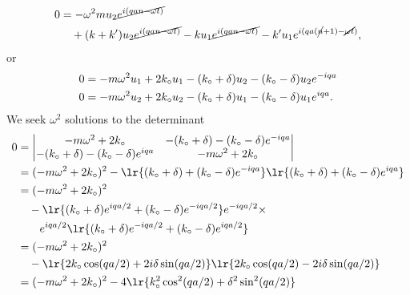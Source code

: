 {\begin{dmath}
\begin{aligned}
0 &= -\omega^2 m
u_2 \cancel{e^{ i(q a n - \omega t) } } \\
&\quad +
( k + k')
u_2 \cancel{e^{ i(q a n - \omega t) } }
- k
u_1 \cancel{e^{ i(q a n - \omega t) } }
- k'
u_1 e^{ i(q a (\cancel{n} + 1) - \cancel{\omega t}) },
\end{aligned}
\end{dmath}
%
or
\begin{equation}\label{eqn:condensedMatterProblemSet4Problem2:340}
\begin{aligned}
0 &= -m \omega^2
u_1
+
2 k_\circ
u_1
- (k_\circ + \delta)
u_2
- (k_\circ - \delta)
u_2 e^{ -i q a } \\
0 &= -m \omega^2
u_2
+
2 k_\circ
u_2
- (k_\circ + \delta)
u_1
- (k_\circ - \delta)
u_1 e^{ i q a }.
\end{aligned}
\end{equation}
%
We seek \(\omega^2\) solutions to the determinant
%
\begin{dmath}\label{eqn:condensedMatterProblemSet4Problem2:380}
\begin{aligned}
0 &=
\begin{vmatrix}
-m \omega^2 + 2 k_\nought &
- (k_\nought + \delta)
- (k_\nought - \delta) e^{ -i q a }
\\
- (k_\nought + \delta)
- (k_\nought - \delta) e^{ i q a }
&
-m \omega^2 + 2 k_\nought
\end{vmatrix} \\
&=
(-m \omega^2 + 2 k_\nought )^2
-
\lr{
  (k_\nought + \delta)
+ (k_\nought - \delta) e^{ -i q a }
}
\lr{
  (k_\nought + \delta)
+ (k_\nought - \delta) e^{ i q a }
} \\
&=
(-m \omega^2 + 2 k_\nought )^2 \\
&\quad -
\lr{
  (k_\nought + \delta)
e^{ i q a/2 }
+ (k_\nought - \delta)
e^{ -i q a/2 }
}
e^{ -i q a/2 } \times \\
&\qquad
e^{ i q a/2 }
\lr{
  (k_\nought + \delta) e^{ -i q a/2 }
+ (k_\nought - \delta) e^{ i q a/2 }
} \\
&=
(-m \omega^2 + 2 k_\nought )^2 \\
&\quad -
\lr{
  2 k_\nought \cos (qa/2)
+ 2i \delta \sin (qa/2)
}
\lr{
  2 k_\nought \cos (qa/2)
- 2i \delta \sin (qa/2)
} \\
&=
(-m \omega^2 + 2 k_\nought )^2
-
4 \lr{
  k_\nought^2 \cos^2 (qa/2)
+ \delta^2 \sin^2 (qa/2)
}
\end{aligned}
\end{dmath}
%
}
